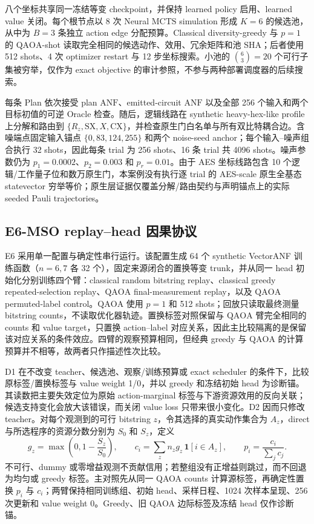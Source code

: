 \documentclass[UTF8,fontset=fandol,11pt]{ctexart}
\newcommand{\anf}{\ensuremath{\mathrm{ANF}}}
\newcommand{\mcts}{\ensuremath{\mathrm{MCTS}}}
\newcommand{\qaoa}{\ensuremath{\mathrm{QAOA}}}
\newcommand{\rz}{\ensuremath{R_z}}
\begin{document}
八个坐标共享同一冻结等变 checkpoint，并保持 learned policy 启用、learned value 关闭。每个根节点以 8 次 Neural \mcts{} simulation 形成 $K=6$ 的候选池，从中为 $B=3$ 条独立 action edge 分配预算。Classical diversity-greedy 与 $p=1$ 的 \qaoa{}-shot 读取完全相同的候选动作、效用、冗余矩阵和池 SHA；后者使用 512 shots、4 次 optimizer restart 与 12 步坐标搜索。小池的 $\binom{6}{3}=20$ 个可行子集被穷举，仅作为 exact objective 的审计参照，不参与两种部署调度器的后续搜索。

每条 Plan 依次接受 plan \anf{}、emitted-circuit \anf{} 以及全部 256 个输入和两个目标初值的可逆 Oracle 检查。随后，逻辑线路在 synthetic heavy-hex-like profile 上分解和路由到 $\{\rz,\mathrm{SX},X,\mathrm{CX}\}$，并检查原生门白名单与所有双比特耦合边。含噪端点固定输入锚点 $\{0,83,124,255\}$ 和两个 noise-seed anchor；每个输入--噪声组合执行 32 shots，因此每条 trial 为 256 shots、16 条 trial 共 4096 shots。噪声参数仍为 $p_1=0.0002$、$p_2=0.003$ 和 $p_r=0.01$。由于 AES 坐标线路包含 10 个逻辑/工作量子位和数万原生门，本案例没有执行逐 trial 的 AES-scale 原生全基态 statevector 穷举等价；原生层证据仅覆盖分解/路由契约与声明锚点上的实际 seeded Pauli trajectories。

\subsection{E6-MSO replay--head 因果协议}

E6 采用单一配置与确定性串行运行。该配置生成 64 个 synthetic VectorANF 训练函数（$n=6,7$ 各 32 个），固定来源闭合的置换等变 trunk，并从同一 head 初始化分别训练四个臂：classical random bitstring replay、classical greedy repeated-selection replay、\qaoa{} final-measurement replay，以及 \qaoa{} permuted-label control。\qaoa{} 使用 $p=1$ 和 512 shots；回放只读取最终测量 bitstring counts，不读取优化器轨迹。置换标签对照保留与 \qaoa{} 臂完全相同的 counts 和 value target，只置换 action--label 对应关系，因此主比较隔离的是保留该对应关系的条件效应。四臂的观察预算相同，但经典 greedy 与 \qaoa{} 的计算预算并不相等，故两者只作描述性次比较。

D1 在不改变 teacher、候选池、观察/训练预算或 exact scheduler 的条件下，比较原标签/置换标签与 value weight 1/0，并以 greedy 和冻结初始 head 为诊断锚。其读数把主要失效定位为原始 action-marginal 标签与下游资源效用的反向关联；候选支持变化会放大该错误，而关闭 value loss 只带来很小变化。D2 因而只修改 teacher。对每个观测到的可行 bitstring $z$，令其选择的真实动作集合为 $A_z$，direct 与所选程序的资源分数分别为 $S_0$ 和 $S_z$，定义
\begin{equation}
g_z=\max\!\left(0,1-\frac{S_z}{S_0}\right),\qquad
c_i=\sum_z n_z g_z\,\mathbf{1}[i\in A_z],\qquad
p_i=\frac{c_i}{\sum_j c_j}.
\label{eq:e6-resource-gain-teacher}
\end{equation}
不可行、dummy 或零增益观测不贡献信用；若整组没有正增益则跳过，而不回退为均匀或 greedy 标签。主对照先从同一 QAOA counts 计算源标签，再确定性置换 $p_i$ 与 $c_i$；两臂保持相同训练组、初始 head、采样日程、1024 次样本呈现、256 次更新和 value weight 0。Greedy、旧 QAOA 边际标签及冻结 head 仅作诊断锚。
\end{document}
